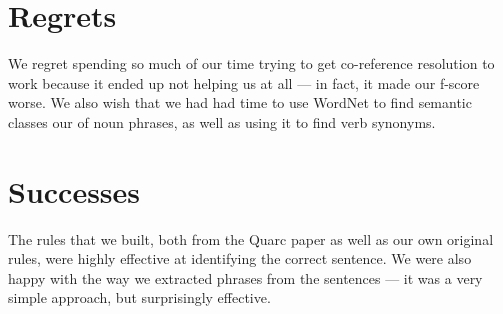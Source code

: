 \documentclass[twoside,11pt]{article}
\begin{document}
\section{Regrets}

We regret spending so much of our time trying to get co-reference resolution to work because it ended up not helping us at all --- in fact, it made our f-score worse. We also wish that we had had time to use WordNet to find semantic classes our of noun phrases, as well as using it to find verb synonyms.

\section{Successes}

The rules that we built, both from the Quarc paper as well as our own original rules, were highly effective at identifying the correct sentence. We were also happy with the way we extracted phrases from the sentences --- it was a very simple approach, but surprisingly effective.
\end{document}

